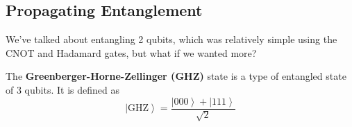 \documentclass{article}
\newcommand{\ket}[1]{\ensuremath{\left|#1\right\rangle}}
\begin{document}
  \subsection{Propagating Entanglement}

    We've talked about entangling 2 qubits, which was relatively simple using the CNOT and Hadamard gates, but what if we wanted more? 

    \begin{definition}
      The \textbf{Greenberger-Horne-Zellinger (GHZ)} state is a type of entangled state of 3 qubits. It is defined as 
      \begin{equation} 
        \ket{\mathrm{GHZ}} = \frac{\ket{000} + \ket{111}}{\sqrt{2}}
      \end{equation}
    \end{definition}
\end{document}
